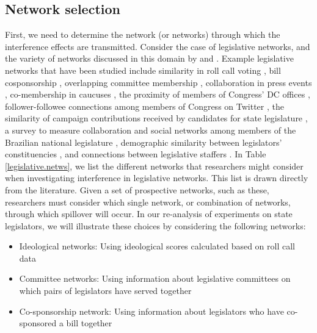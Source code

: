\documentclass[12pt]{article}
\begin{document}
 \subsection{Network selection}
First, we need to determine the network (or networks) through which the interference effects are transmitted. Consider the case of legislative networks, and the variety of networks discussed in this domain by \citet{kirkland2014measurement} and \cite{desmarais2015measuring}. Example legislative networks that have been studied include similarity in roll call voting \citep{kim2012comparing}, bill cosponsorship \citep{fowler2006connecting}, overlapping committee membership \citep{porter2005network}, collaboration in press events \citep{desmarais2015measuring}, co-membership in caucuses \citep{victor2009social}, the proximity of members of Congress' DC offices \citep{rogowski2012estimating}, follower-followee connections among members of Congress on Twitter \citep{peng2016follower}, the similarity of campaign contributions received by candidates for state legislature \citep{masket2015polarization}, a survey to measure collaboration and social networks among members of the Brazilian national legislature \citep{wojcik2017legislative}, demographic similarity between legislators' constituencies \citep{bratton2011networks}, and connections between legislative staffers \citep{ringe2013keeping}.  In Table \ref{legislative.netws}, we list the different networks that researchers might consider when investigating interference in legislative networks. This list is drawn directly from the literature. Given a set of prospective networks, such as these, researchers must consider which single network, or combination of networks, through which spillover will occur. In our re-analysis of experiments on state legislators, we will illustrate these choices by considering the following networks:
\begin{itemize}
\item Ideological networks: Using ideological scores calculated based on roll call data
\item Committee networks: Using information about legislative committees on which pairs of legislators have served together
\item Co-sponsorship network: Using information about legislators who have co-sponsored a bill together
\end{itemize}
\end{document}
